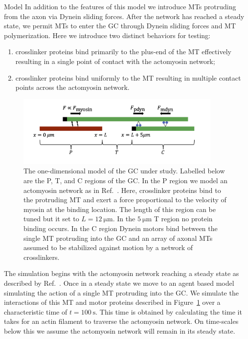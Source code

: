 \documentclass{beamer}
\newlength{\colwidth}
\begin{document}
\begin{frame}[t]
\begin{columns}[t]
\begin{column}{\colwidth}
\begin{block}{Model}
In addition to the features of this model we introduce MTs protruding from the axon via Dynein sliding forces. After the network has reached a steady state, we permit MTs to enter the GC through Dynein sliding forces and MT polymerization. Here we introduce two distinct behaviors for testing:
\begin{enumerate}
\item crosslinker proteins bind primarily to the plus-end of the MT effectively resulting in a single point of contact with the actomyosin network;
\item crosslinker proteins bind uniformly to the MT resulting in multiple contact points across the actomyosin network.
\end{enumerate}

\begin{figure}
    \centering
    \includegraphics[width=0.9\textwidth]{figures/model/model.png}
    \caption{\label{fig:main_model}
        The one-dimensional model of the GC under study. Labelled below are the P, T, and C regions of the GC. In the P region we model an actomyosin network as in Ref.~\cite{craig_membrane_2012}. Here, crosslinker proteins bind to the protruding MT and exert a force proportional to the velocity of myosin at the binding location. The length of this region can be tuned but it set to \(L=\qty{12}{\micro\meter}\). In the \(\qty{5}{\micro\meter}\) T region no protein binding occurs. In the C region Dynein motors bind between the single MT protruding into the GC and an array of axonal MTs assumed to be stabilized against motion by a network of crosslinkers.
    }
\end{figure}

The simulation begins with the actomyosin network reaching a steady state as described by Ref.~\cite{craig_membrane_2012}. Once in a steady state we move to an agent based model simulating the action of a single MT protruding into the GC. We simulate the interactions of this MT and motor proteins described in Figure~\ref{fig:main_model} over a characteristic time of \(t=\qty{100}{\second}\). This time is obtained by calculating the time it takes for an actin filament to traverse the actomyosin network. On time-scales below this we assume the actomyosin network will remain in its steady state.


\end{block}
\end{column}
\end{columns}
\end{frame}
\end{document}
